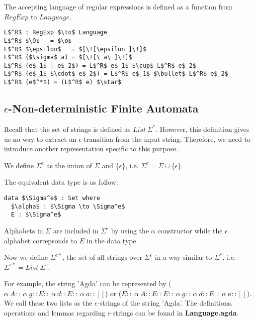 \par The accepting language of regular expressions is defined as
a function from \(RegExp\) to \(Language\). 

\begin{lstlisting}[mathescape=true,xleftmargin=.3\textwidth]
L$^R$ : RegExp $\to$ Language
L$^R$ $\O$   = $\o$
L$^R$ $\epsilon$   = $[\![\epsilon ]\!]$
L$^R$ ($\sigma$ a) = $[\![\ a\ ]\!]$
L$^R$ (e$_1$ | e$_2$) = L$^R$ e$_1$ $\cup$ L$^R$ e$_2$
L$^R$ (e$_1$ $\cdot$ e$_2$) = L$^R$ e$_1$ $\bullet$ L$^R$ e$_2$
L$^R$ (e$^*$) = (L$^R$ e) $\star$
\end{lstlisting} 


\subsection{\(\epsilon\)-Non-deterministic Finite Automata}
\par Recall that the set of strings is defined as \(List\
\Sigma^*\). However, this definition gives us no way to
extract an \(\epsilon\)-transition from the input string. Therefore,
we need to introduce another representation specific to this purpose. 

\begin{defn}
\noindent We define \(\Sigma^e\) as the union of
\(\Sigma\) and \(\{\epsilon\}\), i.e. \(\Sigma^e = \Sigma \cup \{\epsilon\}\).
\end{defn} 

\par The equivalent data type is as follow:
\begin{lstlisting}[mathescape=true,xleftmargin=.3\textwidth]
data $\Sigma^e$ : Set where
  $\alpha$ : $\Sigma \to \Sigma^e$
  E : $\Sigma^e$
\end{lstlisting}

\par Alphabets in \(\Sigma\) are included in \(\Sigma^e\) by using the
\(\alpha\) constructor while the \(\epsilon\) alphabet correpsonds to \(E\)
in the data type. 

\begin{defn}
\noindent Now we define \(\Sigma^{e*}\), the set of all strings over
\(\Sigma^e\) in a way similar to \(\Sigma^*\), i.e. \(\Sigma^{e*} =
List\ \Sigma^e\). 
\end{defn}

\par For example, the string 'Agda' can be
represented by (\(\alpha\ A ::\ \alpha\ g :: E ::\ \alpha\ d :: E ::\ \alpha\
a :: []\)) or (\(E ::\ \alpha\ A :: E :: E ::\ \alpha\ g ::\ \alpha\ d :: E ::\ \alpha\
a :: []\)). We call these two lists as the \(\epsilon\)-strings of the
string 'Agda'. The definitions, operations and lemmas regarding
\(\epsilon\)-strings can be found in \textbf{Language.agda}. 

